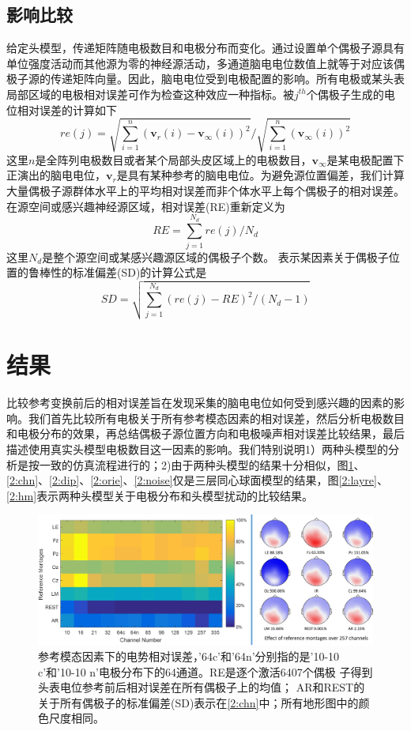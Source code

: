 \subsection{影响比较}
给定头模型，传递矩阵随电极数目和电极分布而变化。通过设置单个偶极子源具有单位强度活动而其他源为零的神经源活动，多通道脑电电位数值上就等于对应该偶极子源的传递矩阵向量。因此，脑电电位受到电极配置的影响。所有电极或某头表局部区域的电极相对误差可作为检查这种效应一种指标。被$j^{th}$个偶极子生成的电位相对误差的计算如下
\begin{equation*}
re(j)=\sqrt{\sum_{i=1}^n(\mathbf{v}_r(i)-\mathbf{v}_{\infty}(i))^2}/\sqrt{\sum_{i=1}^n(\mathbf{v}_{\infty}(i))^2}
\end{equation*}
这里$n$是全阵列电极数目或者某个局部头皮区域上的电极数目，$\mathbf{v}_{\infty}$是某电极配置下正演出的脑电电位，$\mathbf{v}_r$是具有某种参考的脑电电位。为避免源位置偏差，我们计算大量偶极子源群体水平上的平均相对误差而非个体水平上每个偶极子的相对误差。在源空间或感兴趣神经源区域，相对误差(RE)重新定义为
\begin{equation*}
RE=\sum_{j=1}^{N_d}re(j)/{N_d}
\end{equation*}
这里$N_d$是整个源空间或某感兴趣源区域的偶极子个数。 表示某因素关于偶极子位置的鲁棒性的标准偏差(SD)的计算公式是
\begin{equation*}
SD=\sqrt{\sum_{j=1}^{N_d}(re(j)-RE)^2/(N_d-1)}
\end{equation*}

\section{结果}
比较参考变换前后的相对误差旨在发现采集的脑电电位如何受到感兴趣的因素的影响。我们首先比较所有电极关于所有参考模态因素的相对误差，然后分析电极数目和电极分布的效果，再总结偶极子源位置方向和电极噪声相对误差比较结果，最后描述使用真实头模型电极数目这一因素的影响。我们特别说明1）两种头模型的分析是按一致的仿真流程进行的；2)由于两种头模型的结果十分相似，图\ref{2:re}、\ref{2:chn}、\ref{2:dip}、\ref{2:orie}、\ref{2:noise}仅是三层同心球面模型的结果，图\ref{2:layre}、\ref{2:hm}表示两种头模型关于电极分布和头模型扰动的比较结果。
\begin{figure}[h!]
	\centering
	\includegraphics[width=15cm]{pic/JNE/figure3.png}
	\caption{参考模态因素下的电势相对误差，'64c'和'64n'分别指的是'10-10 c'和'10-10 n'电极分布下的64通道。RE是逐个激活6407个偶极
	子得到头表电位参考前后相对误差在所有偶极子上的均值； AR和REST的关于所有偶极子的标准偏差(SD)表示在\ref{2:chn}中；所有地形图中的颜
	色尺度相同。}
	\label{2:re}
\end{figure}
